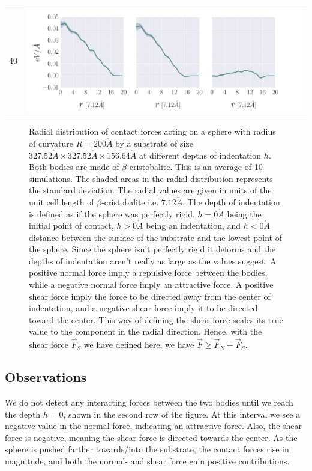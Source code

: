 \documentclass[twoside,english]{uiofysmaster}
\begin{document}
\begin{table}[H]
\begin{tabular}{cr}
		40 & \parbox[c]{0.83\linewidth}{
			\includegraphics[width=\linewidth, trim={8mm 0 35mm 3mm}, clip]{figures/forceDistribution/radialResults/timestep_110000.pdf}
		}\\
		
	\end{tabular}
\end{table}
\begin{figure}[H]
	\caption{Radial distribution of contact forces acting on a sphere with radius of curvature $R=200\mathring{A}$ by a substrate of size $327.52\mathring{A} \times 327.52\mathring{A} \times 156.64\mathring{A}$ at different depths of indentation $h$. 
		Both bodies are made of $\beta$-cristobalite.
		This is an average of 10 simulations. 
		The shaded areas in the radial distribution represents the standard deviation.
		The radial values are given in units of the unit cell length of $\beta$-cristobalite i.e. $7.12\mathring{A}$. 
		The depth of indentation is defined as if the sphere was perfectly rigid. 
		$h=0\mathring{A}$ being the initial point of contact, $h>0\mathring{A}$ being an indentation, and $h<0\mathring{A}$ distance between the surface of the substrate and the lowest point of the sphere. 
		Since the sphere isn't perfectly rigid it deforms and the depths of indentation aren't really as large as the values suggest. 	 		
		A positive normal force imply a repulsive force between the bodies, while a negative normal force imply an attractive force. 
		A positive shear force imply the force to be directed away from the center of indentation, and a negative shear force imply it to be directed toward the center. 
		This way of defining the shear force scales its true value to the component in the radial direction.
		Hence, with the shear force $\vec{F}_S$ we have defined here, we have $\vec{F} \geq \vec{F}_N + \vec{F}_S$.
}
\label{fig:resultsRadialForceDistributions}
\end{figure}

\subsection{Observations}
 We do not detect any interacting forces between the two bodies until we reach the depth $h=0$, shown in the second row of the figure. 
 At this interval we see a negative value in the normal force, indicating an attractive force. 
 Also, the shear force is negative, meaning the shear force is directed towards the center. 
 As the sphere is pushed farther towards/into the substrate, the contact forces rise in magnitude, and both the normal- and shear force gain positive contributions. 
 
\end{document}
